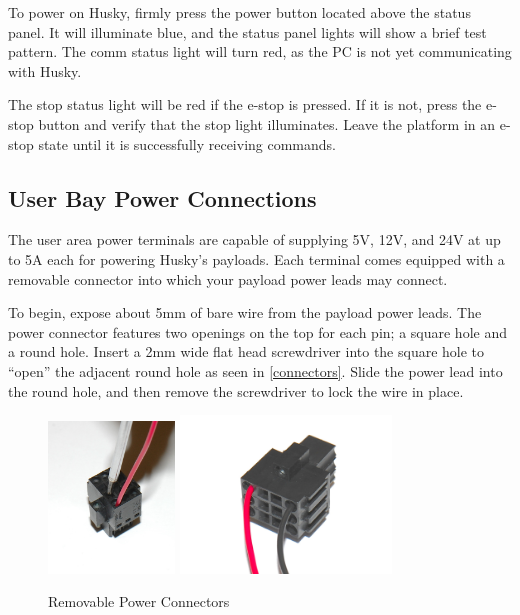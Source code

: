 \documentclass[]{clearpath-latex/clearpath-manual}
\begin{document}
To power on Husky, firmly press the power button located above the status panel. It will illuminate blue, and the 
status panel lights will show a brief test pattern. The comm status light will turn red, as the PC is not yet 
communicating with Husky.

The stop status light will be red if the e-stop is pressed. If it is not, press the e-stop button and 
verify that the stop light illuminates. Leave the platform in an e-stop state until it is successfully receiving commands.

\subsection{User Bay Power Connections}
The user area power terminals are capable of supplying 5V, 12V, and 24V at up to 5A each for powering Husky’s payloads.  
Each terminal comes equipped with a removable connector into which your payload power leads may connect.

To begin, expose about 5mm of bare wire from the payload power leads. The power connector features two 
openings on the top for each pin; a square hole and a round hole. Insert a 2mm wide flat head screwdriver 
into the square hole to “open” the adjacent round hole as seen in \autoref{connectors}. Slide the power lead into the round hole, and then 
remove the screwdriver to lock the wire in place.

\begin{figure}[h]
	\centering
	\includegraphics[width=0.3\textwidth]{power-connector-1.png}
	\includegraphics[width=0.5\textwidth]{power-connector-2.png}
	\caption{Removable Power Connectors}
	\label{connectors}
\end{figure}
\end{document}
